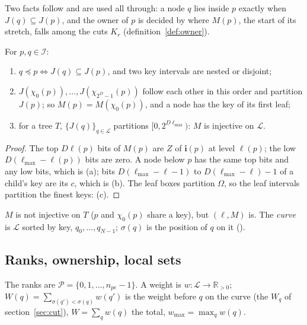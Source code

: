 Two facts follow and are used all through: a node $q$ lies inside $p$
exactly when $J(q) \subseteq J(p)$, and the owner of $p$ is decided by
where $M(p)$, the start of its stretch, falls among the cuts $K_r$
(definition~\ref{def:owner}).

\begin{proposition}
  \label{prop:morton}
  For $p, q \in \mathcal{I}$:
  \begin{enumerate}[label=(\alph*)]
    \item $q \preceq p \iff J(q) \subseteq J(p)$, and two key intervals are
      nested or disjoint;
    \item $J(\chi_0(p)), \ldots, J(\chi_{2^D-1}(p))$ follow each other in
      this order and partition $J(p)$; so $M(p) = M(\chi_0(p))$, and a node
      has the key of its first leaf;
    \item for a tree $T$, $\{J(q)\}_{q \in \mathcal{L}}$ partitions $[0,
      2^{D \ell_{\max}})$: $M$ is injective on $\mathcal{L}$.
  \end{enumerate}
\end{proposition}

\begin{proof}
  The top $D\ell(p)$ bits of $M(p)$ are $Z$ of $\mathbf{i}(p)$ at level
  $\ell(p)$; the low $D(\ell_{\max} - \ell(p))$ bits are zero. A node below
  $p$ has the same top bits and any low bits, which is (a); bits $D(\ell_{
  \max} - \ell - 1)$ to $D(\ell_{\max} - \ell) - 1$ of a child's key are its
  $c$, which is (b). The leaf boxes partition $\Omega$, so the leaf
  intervals partition the finest keys: (c).
\end{proof}

$M$ is not injective on $T$ ($p$ and $\chi_0(p)$ share a key), but $(\ell,
M)$ is. The \emph{curve} is $\mathcal{L}$ sorted by key, $q_0, \ldots,
q_{N-1}$; $\sigma(q)$ is the position of $q$ on it ().

\subsection{Ranks, ownership, local sets}

\begin{definition}
  The ranks are $\mathcal{P} = \{0, 1, \ldots, n_{pe} - 1\}$. A weight is
  $w : \mathcal{L} \to \mathbb{R}_{>0}$; $W(q) = \sum_{\sigma(q') <
  \sigma(q)} w(q')$ is the weight before $q$ on the curve (the $W_q$ of
  section~\ref{sec:cut}), $W = \sum_{q} w(q)$ the total, $w_{\max} =
  \max_q w(q)$.
\end{definition}

